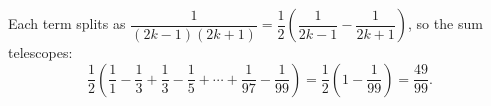 Each term splits as $\dfrac{1}{(2k-1)(2k+1)}=\dfrac12\left(\dfrac{1}{2k-1}-\dfrac{1}{2k+1}\right)$, so the sum telescopes:
\[\dfrac12\left(\dfrac11-\dfrac13+\dfrac13-\dfrac15+\cdots+\dfrac{1}{97}-\dfrac{1}{99}\right)=\dfrac12\left(1-\dfrac{1}{99}\right)=\boxed{\dfrac{49}{99}}.\]
